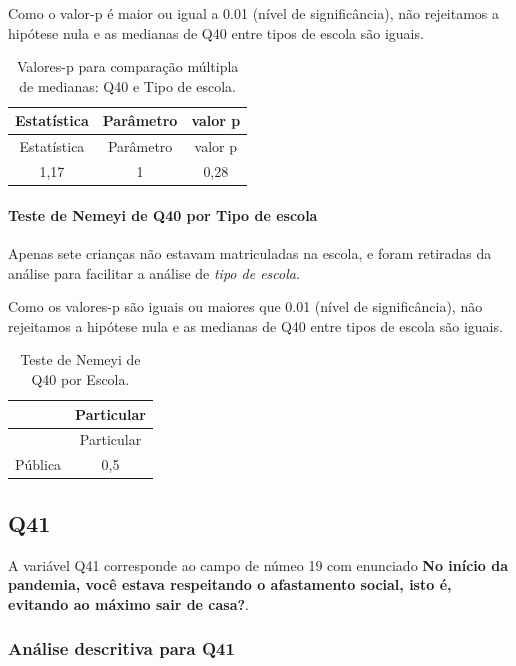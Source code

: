 \documentclass[]{article}
\let\oldparagraph\paragraph
\renewcommand{\paragraph}[1]{\oldparagraph{#1}\mbox{}}
\begin{document}
Como o valor-p é maior ou igual a 0.01 (nível de significância), não rejeitamos a hipótese nula e as medianas de Q40 entre tipos de escola são iguais.

\begin{longtable}[]{@{}ccc@{}}
\caption{\label{tab:unnamed-chunk-1594}Valores-p para comparação múltipla de medianas: Q40 e Tipo de escola.}\tabularnewline
\toprule
Estatística & Parâmetro & valor p\tabularnewline
\midrule
\endfirsthead
\toprule
Estatística & Parâmetro & valor p\tabularnewline
\midrule
\endhead
1,17 & 1 & 0,28\tabularnewline
\bottomrule
\end{longtable}

\hypertarget{teste-de-nemeyi-de-q40-por-tipo-de-escola}{%
\paragraph{Teste de Nemeyi de Q40 por Tipo de escola}\label{teste-de-nemeyi-de-q40-por-tipo-de-escola}}

Apenas sete crianças não estavam matriculadas na escola, e foram retiradas da análise para facilitar a análise de \emph{tipo de escola}.

Como os valores-p são iguais ou maiores que 0.01 (nível de significância), não rejeitamos a hipótese nula e as medianas de Q40 entre tipos de escola são iguais.

\begin{longtable}[]{@{}lc@{}}
\caption{\label{tab:unnamed-chunk-1596}Teste de Nemeyi de Q40 por Escola.}\tabularnewline
\toprule
& Particular\tabularnewline
\midrule
\endfirsthead
\toprule
& Particular\tabularnewline
\midrule
\endhead
Pública & 0,5\tabularnewline
\bottomrule
\end{longtable}

\cleardoublepage

\hypertarget{q41}{%
\subsection{Q41}\label{q41}}

A variável Q41 corresponde ao campo de númeo 19 com enunciado \textbf{No início da pandemia, você estava respeitando o afastamento social, isto é, evitando ao máximo sair de casa?}.

\hypertarget{anuxe1lise-descritiva-para-q41}{%
\subsubsection{Análise descritiva para Q41}\label{anuxe1lise-descritiva-para-q41}}
\end{document}
